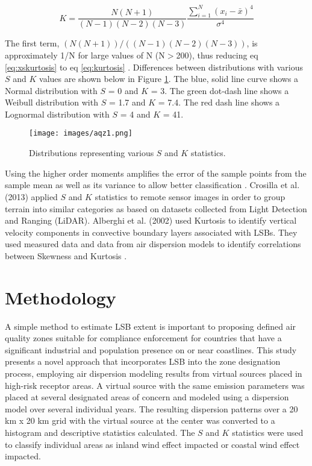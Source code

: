 \begin{equation}
\label{eq:xskurtosis}
K = \frac{N(N+1)}{(N-1)(N-2)(N-3)} \frac{\sum_{i=1}^{N}\left (x_{i}-\bar{x} \right )^{4}}{\sigma^{4}}
\end{equation}

The first term, $(N(N+1))/((N-1)(N-2)(N-3))$, is approximately 1/N for large values of N (N$>$200), thus reducing eq \ref{eq:xskurtosis} to eq \ref{eq:kurtosis} \citep{Cox2010}.  Differences between distributions with various $S$ and $K$ values are shown below in Figure \ref{fig:SKcurves}.  The blue, solid line curve shows a Normal distribution with $S$ = 0 and $K$ = 3. The green dot-dash line shows a Weibull distribution with $S$ = 1.7 and $K$ = 7.4.  The red dash line shows a Lognormal distribution with $S$ = 4 and $K$ = 41. 
%
\begin{figure}[H]
\centering
\texttt{[image: images/aqz1.png]} 
\caption{Distributions representing various $S$ and $K$ statistics.}
\label{fig:SKcurves}
\end{figure}
%
Using the higher order moments amplifies the error of the sample points from the sample mean as well as its variance to allow better classification \citep{Seo2011}.  Crosilla et al. (2013) applied $S$ and $K$ statistics to remote sensor images in order to group terrain into similar categories as based on datasets collected from Light Detection and Ranging (LiDAR).  Alberghi et al. (2002) used Kurtosis to identify vertical velocity components in convective boundary layers associated with LSBs.  They used measured data and data from air dispersion models to identify correlations between Skewness and Kurtosis \citep{Alberghi2002}.

\section{Methodology}

A simple method to estimate LSB extent is important to proposing defined air quality zones suitable for compliance enforcement for countries that have a significant industrial and population presence on or near coastlines.  This study presents a novel approach that incorporates LSB into the zone designation process, employing air dispersion modeling results from virtual sources placed in high-risk receptor areas.  A virtual source with the same emission parameters was placed at several designated areas of concern and modeled using a dispersion model over several individual years.  The resulting dispersion patterns over a 20 km x 20 km grid with the virtual source at the center was converted to a histogram and descriptive statistics calculated.  The $S$ and $K$ statistics were used to classify individual areas as inland wind effect impacted or coastal wind effect impacted.

